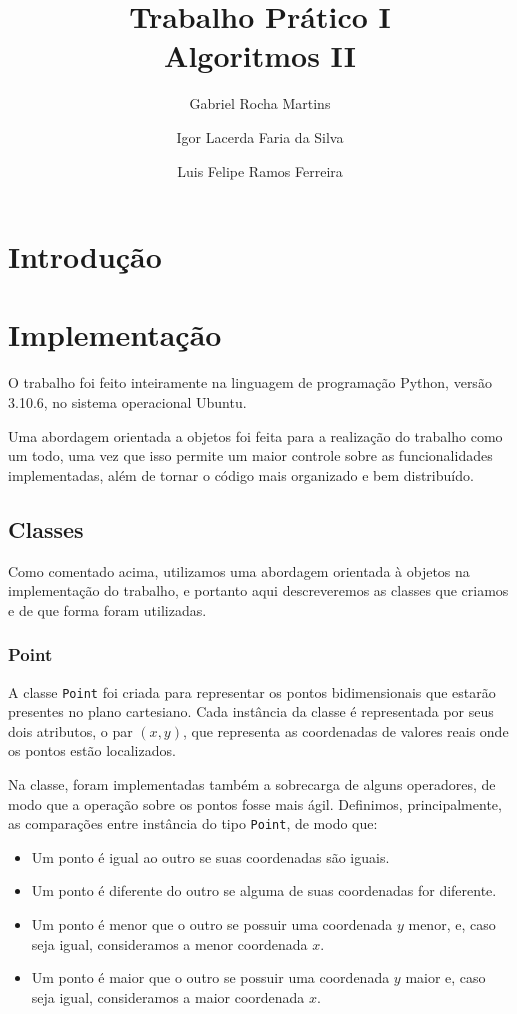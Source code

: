 \documentclass{article}
\author{
    Gabriel Rocha Martins
    \and 
    Igor Lacerda Faria da Silva
    \and 
    Luis Felipe Ramos Ferreira
}
\title{Trabalho Prático I \\
Algoritmos II}
\date{%
}
\begin{document}
\maketitle

\section{Introdução}

\section{Implementação}
O trabalho foi feito inteiramente na linguagem de programação Python, versão 3.10.6, no sistema operacional Ubuntu.

Uma abordagem orientada a objetos foi feita para a realização do trabalho como um todo, uma vez que isso permite um maior controle sobre as funcionalidades implementadas, além de tornar o código mais organizado e bem distribuído.

\subsection{Classes}
Como comentado acima, utilizamos uma abordagem orientada à objetos na implementação do trabalho, e portanto aqui descreveremos as classes que criamos e de que forma foram utilizadas.

\subsubsection{Point}

A classe \texttt{Point} foi criada para representar os pontos bidimensionais que estarão presentes no plano cartesiano. Cada instância da classe é representada por seus dois atributos, o par \( (x,y) \), que representa as coordenadas de valores reais onde os pontos estão localizados.

Na classe, foram implementadas também a sobrecarga de alguns operadores, de modo que a operação sobre os pontos fosse mais ágil. Definimos, principalmente, as comparações entre instância do tipo \texttt{Point}, de modo que:

\begin{itemize}
	\item Um ponto é igual ao outro se suas coordenadas são iguais.
	\item Um ponto é diferente do outro se alguma de suas coordenadas for diferente.
	\item Um ponto é menor que o outro se possuir uma coordenada \( y \) menor, e, caso seja igual, consideramos a menor coordenada \( x \).
	\item Um ponto é maior que o outro se possuir uma coordenada \( y \) maior e, caso seja igual, consideramos a maior coordenada \( x \).
\end{itemize}
\end{document}
